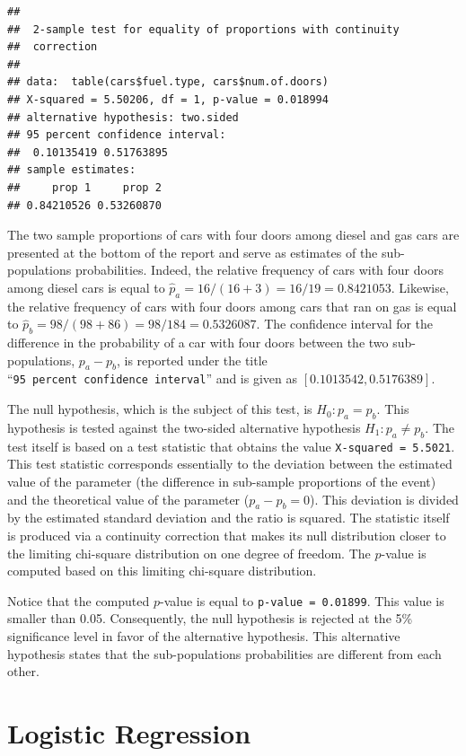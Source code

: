 \documentclass[]{krantz}
\theoremstyle{definition}
\theoremstyle{definition}
\theoremstyle{definition}
\theoremstyle{remark}
\begin{document}
\begin{verbatim}
## 
##  2-sample test for equality of proportions with continuity
##  correction
## 
## data:  table(cars$fuel.type, cars$num.of.doors)
## X-squared = 5.50206, df = 1, p-value = 0.018994
## alternative hypothesis: two.sided
## 95 percent confidence interval:
##  0.10135419 0.51763895
## sample estimates:
##     prop 1     prop 2 
## 0.84210526 0.53260870
\end{verbatim}

The two sample proportions of cars with four doors among diesel and gas
cars are presented at the bottom of the report and serve as estimates of
the sub-populations probabilities. Indeed, the relative frequency of
cars with four doors among diesel cars is equal to
\(\hat p_a = 16/(16+3) = 16/19 = 0.8421053\). Likewise, the relative
frequency of cars with four doors among cars that ran on gas is equal to
\(\hat p_b = 98/(98+86) = 98/184 = 0.5326087\). The confidence interval
for the difference in the probability of a car with four doors between
the two sub-populations, \(p_a - p_b\), is reported under the title
``\texttt{95\ percent\ confidence\ interval}'' and is given as
\([0.1013542, 0.5176389]\).

The null hypothesis, which is the subject of this test, is
\(H_0: p_a = p_b\). This hypothesis is tested against the two-sided
alternative hypothesis \(H_1: p_a \not = p_b\). The test itself is based
on a test statistic that obtains the value
\texttt{X-squared\ =\ 5.5021}. This test statistic corresponds
essentially to the deviation between the estimated value of the
parameter (the difference in sub-sample proportions of the event) and
the theoretical value of the parameter (\(p_a - p_b = 0\)). This
deviation is divided by the estimated standard deviation and the ratio
is squared. The statistic itself is produced via a continuity correction
that makes its null distribution closer to the limiting chi-square
distribution on one degree of freedom. The \(p\)-value is computed based
on this limiting chi-square distribution.

Notice that the computed \(p\)-value is equal to
\texttt{p-value\ =\ 0.01899}. This value is smaller than 0.05.
Consequently, the null hypothesis is rejected at the 5\% significance
level in favor of the alternative hypothesis. This alternative
hypothesis states that the sub-populations probabilities are different
from each other.

\section{Logistic Regression}\label{logistic-regression}
\end{document}
